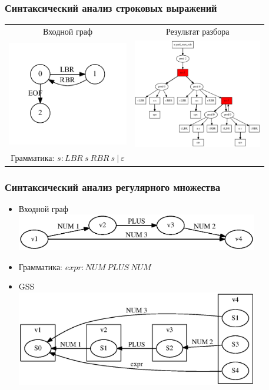 \documentclass{beamer}
\begin{document}
\begin{frame}[fragile]
	\transwipe[direction=90]
	\frametitle{Синтаксический анализ строковых выражений}
	\begin{center}
	\begin{tabular}{c|c}
	  Входной граф & Результат разбора
	  \\
	  \includegraphics[width=150pt]{picts/UnambiguousBrackets_Circle.pdf}
	  &\includegraphics[width=160pt]{picts/sppf.eps}
	    
	  \\
	  Грамматика: 
    $s : LBR \ s \ RBR \ s \ | \ \varepsilon $
  \end{tabular}
  \end{center}
\end{frame}

\begin{frame}[fragile]
	\transwipe[direction=90]
	\frametitle{Синтаксический анализ регулярного множества}
  \begin{itemize}
  \item
	  Входной граф 
	  \\
	  \includegraphics[width=300pt]{picts/agss_input.eps}
	\item
  
	  Грамматика: 
    $expr : NUM \ PLUS \ NUM$
	\item
	  GSS
	  \\
	  \includegraphics[width=300pt]{picts/agss.eps}
\end{itemize}
\end{frame}
\end{document}
